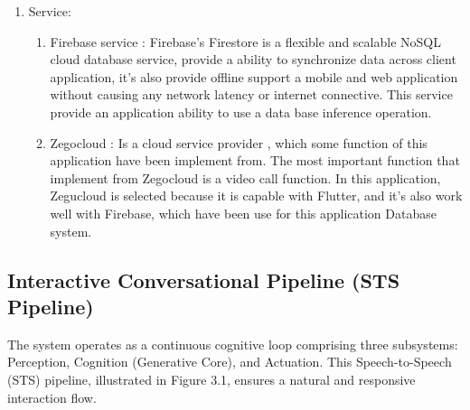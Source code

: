 \newpage
\begin{enumerate}[leftmargin=1.2cm]
	\item Service:
	\begin{enumerate}[label=\alph*.] 
		\item Firebase service   : Firebase's Firestore is a flexible and scalable NoSQL cloud database service, provide a ability to synchronize data across client application, it's also provide offline support a mobile and web application without causing any network latency or internet connective. This service provide an application ability to use a data base inference operation.  
		
		\item Zegocloud      : Is a cloud service provider , which some function of this application have been implement from. The most important function that implement from Zegocloud is  a video call function. In this application, Zegucloud is selected because it is capable with Flutter, and it's also work well with Firebase, which have been use for this application Database system.
	\end{enumerate}
	
\end{enumerate}

\newpage
\subsection{Interactive Conversational Pipeline (STS Pipeline)}
{ 
	\setlength{\leftskip}{1cm}
	\setlength{\parindent}{2.5em}
	The system operates as a continuous cognitive loop comprising three subsystems: Perception, Cognition (Generative Core), and Actuation. This Speech-to-Speech (STS) pipeline, illustrated in Figure 3.1, ensures a natural and responsive interaction flow.
	\par
}

